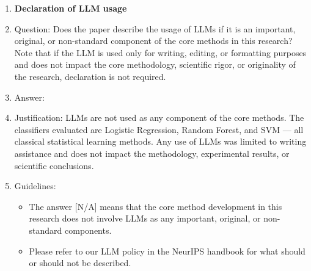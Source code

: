 \documentclass{article}
\begin{document}
\begin{enumerate}
\item {\bf Declaration of LLM usage}
    \item[] Question: Does the paper describe the usage of LLMs if it is an important, original, or
non-standard component of the core methods in this research? Note that if the LLM is used
only for writing, editing, or formatting purposes and does not impact the core methodology,
scientific rigor, or originality of the research, declaration is not required.
    \item[] Answer: \answerNA{}
    \item[] Justification: LLMs are not used as any component of the core methods. The
    classifiers evaluated are Logistic Regression, Random Forest, and SVM --- all classical
    statistical learning methods. Any use of LLMs was limited to writing assistance and does
    not impact the methodology, experimental results, or scientific conclusions.
    \item[] Guidelines:
    \begin{itemize}
        \item The answer [N/A] means that the core method development in this research does not
involve LLMs as any important, original, or non-standard components.
        \item Please refer to our LLM policy in the NeurIPS handbook for what should or should not
be described.
    \end{itemize}

\end{enumerate}
\end{document}
